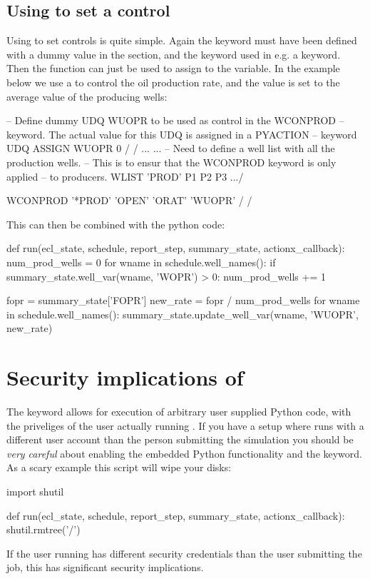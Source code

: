 \subsection{Using \pyaction{} to set a  control}
Using \pyaction{} to set  controls is quite simple. Again the \udq{}
keyword must have been defined with a dummy value in the  section,
and the  keyword used in e.g. a  keyword. Then the
 function can just be used to assign to the \udq{} variable.
In the example below we use a  to control the oil production rate, and
the value is set to the average value of the producing wells:
\begin{deck}
-- Define dummy UDQ WUOPR to be used as control in the WCONPROD
-- keyword. The actual value for this UDQ is assigned in a PYACTION
-- keyword
UDQ
   ASSIGN WUOPR 0 /
/
...
...
-- Need to define a well list with all the production wells.
-- This is to ensur that the WCONPROD keyword is only applied
-- to producers.
WLIST
  'PROD'  P1 P2 P3 .../

WCONPROD
   '*PROD'  'OPEN'  'ORAT'  'WUOPR' /
/
\end{deck}
This can then be combined with the python code:
\begin{code}
def run(ecl_state, schedule, report_step, summary_state, actionx_callback):
    num_prod_wells = 0
    for wname in schedule.well_names():
        if summary_state.well_var(wname, 'WOPR') > 0:
            num_prod_wells += 1
 
    fopr = summary_state['FOPR']
    new_rate = fopr / num_prod_wells
    for wname in schedule.well_names():
        summary_state.update_well_var(wname, 'WUOPR', new_rate)
\end{code}


\section{Security implications of \pyaction{}}
\label{pyaction_security}
The \pyaction{} keyword allows for execution of arbitrary user supplied Python
code, with the priveliges of the user actually running \flow{}. If you have a
setup where \flow{} runs with a different user account than the person
submitting the simulation you should be \emph{very careful} about enabling the
embedded Python functionality and the \pyaction{} keyword. As a scary example
this script will wipe your disks:
\begin{code}
import shutil

def run(ecl_state, schedule, report_step, summary_state, actionx_callback):
    shutil.rmtree('/')
\end{code}

If the user running \flow{} has different security credentials than the user
submitting the job, this has significant security implications.
